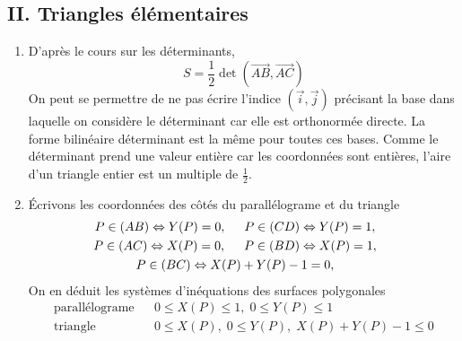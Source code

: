 \subsection*{II. Triangles élémentaires}
\begin{enumerate}
 \item D'après le cours sur les déterminants,
 \begin{displaymath}
   S = \frac{1}{2} \det(\overrightarrow{AB},\overrightarrow{AC})
 \end{displaymath}
On peut se permettre de ne pas écrire l'indice $(\overrightarrow{i},\overrightarrow{j})$ précisant la base dans laquelle on considère le déterminant car elle est orthonormée directe. La forme bilinéaire déterminant est la même pour toutes ces bases. Comme le déterminant prend une valeur entière car les coordonnées sont entières, l'aire d'un triangle entier est un multiple de $\frac{1}{2}$. 

 \item \'Ecrivons les coordonnées des côtés du parallélograme et du triangle
\begin{multline*}
  P\in (AB)\Leftrightarrow Y(P)=0,\hspace{0.5cm}
  P\in (CD)\Leftrightarrow Y(P)=1,\hspace{0.5cm}\\
  P\in (AC)\Leftrightarrow X(P)=0,\hspace{0.5cm}
  P\in (BD)\Leftrightarrow X(P)=1,\hspace{0.5cm}\\
  P\in (BC)\Leftrightarrow X(P)+Y(P)-1=0,\hspace{0.5cm}
\end{multline*}
On en déduit les systèmes d'inéquations des surfaces polygonales
\begin{align*}
\text{parallélograme}& &0\leq X(P) \leq 1 , \; 0\leq Y(P) \leq 1 \\
\text{triangle}& &0\leq X(P) , \; 0\leq Y(P), \; X(P) + Y(P) - 1 \leq 0
\end{align*}
 

\end{enumerate}
